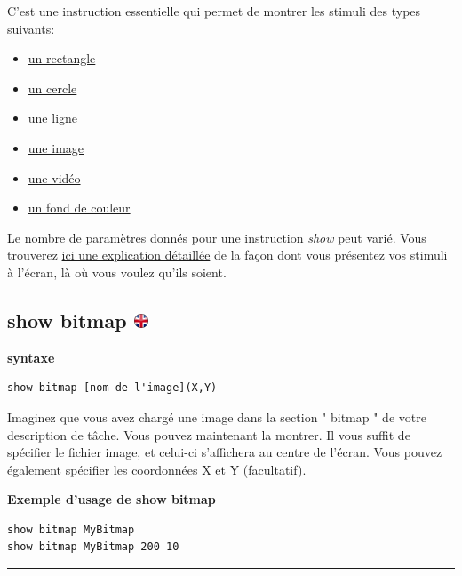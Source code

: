 \documentclass[
]{book}
\providecommand{\tightlist}{%
  \setlength{\itemsep}{0pt}\setlength{\parskip}{0pt}}
\begin{document}
C'est une instruction essentielle qui permet de montrer les stimuli des types suivants:

\begin{itemize}
\tightlist
\item
  \protect\hyperlink{task-show-rectangle}{un rectangle}
\item
  \protect\hyperlink{task-show-circle}{un cercle}
\item
  \protect\hyperlink{task-show-text}{une ligne}
\item
  \protect\hyperlink{task-show-bitmap}{une image}
\item
  \protect\hyperlink{task-show-video}{une vidéo}
\item
  \protect\hyperlink{task-show-background}{un fond de couleur}
\end{itemize}

Le nombre de paramètres donnés pour une instruction \emph{show} peut varié. Vous trouverez \protect\hyperlink{s4-2}{ici une explication détaillée} de la façon dont vous présentez vos stimuli à l'écran, là où vous voulez qu'ils soient.

\hypertarget{show-bitmap}{%
\subsection[show bitmap ]{\texorpdfstring{show bitmap \href{https://www.psytoolkit.org/doc3.2.0/syntax.html\#task-show-bitmap}{\protect\includegraphics{img/ukflag.png}}}{show bitmap }}\label{show-bitmap}}

\textbf{syntaxe}

\begin{verbatim}
show bitmap [nom de l'image](X,Y)
\end{verbatim}

Imaginez que vous avez chargé une image dans la section " bitmap " de votre description de tâche. Vous pouvez maintenant la montrer. Il vous suffit de spécifier le fichier image, et celui-ci s'affichera au centre de l'écran. Vous pouvez également spécifier les coordonnées X et Y (facultatif).

\textbf{Exemple d'usage de show bitmap}

\begin{verbatim}
show bitmap MyBitmap
show bitmap MyBitmap 200 10
\end{verbatim}

\begin{center}\rule{0.5\linewidth}{\linethickness}\end{center}
\end{document}
